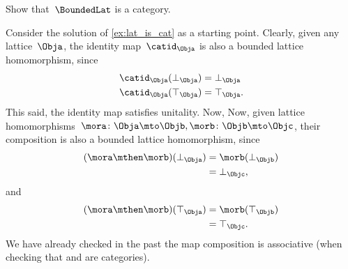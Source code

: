 \begin{exercise}
    \label{ex:boundlat_is_cat}
    Show that~$\BoundedLat$ is a category.
\end{exercise}

\begin{solution}
    Consider the solution of \cref{ex:lat_is_cat} as a starting point.
    Clearly, given any lattice~$\Obja$, the identity map~$\catid_\Obja$ is also a bounded lattice homomorphism, since
    \begin{equation*}
        \begin{aligned}
            \catid_\Obja(\bot_\Obja) & =\bot_\Obja  \\
            \catid_\Obja(\top_\Obja) & =\top_\Obja.
        \end{aligned}
    \end{equation*}
    This said, the identity map satisfies unitality.
    Now,  Now, given lattice homomorphisms~$\mora\colon \Obja \mto \Objb, \morb\colon \Objb\mto \Objc$, their composition is also a bounded lattice homomorphism, since
    \begin{equation*}
        \begin{aligned}
            (\mora \mthen \morb)(\bot_\Obja)
             & = \morb(\bot_\Objb) \\
             & = \bot_\Objc,
        \end{aligned}
    \end{equation*}
    and
    \begin{equation*}
        \begin{aligned}
            (\mora \mthen \morb)(\top_\Obja)
             & = \morb(\top_\Objb) \\
             & = \top_\Objc.
        \end{aligned}
    \end{equation*}
    We have already checked in the past the map composition is associative (\eg when checking that \Set and \Pos are categories).
\end{solution}
